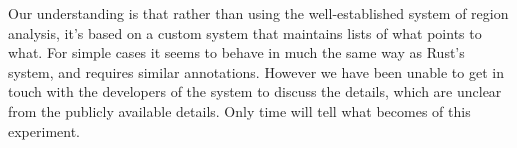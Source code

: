 Our understanding is that rather than using the well-established system of
region analysis, it's based on a custom system that maintains lists of what
points to what. For simple cases it seems to behave in much the
same way as Rust's system, and requires similar annotations. However we have been
unable to get in touch with the developers of the system to discuss the details,
which are unclear from the publicly available details. Only time will tell
what becomes of this experiment.
















